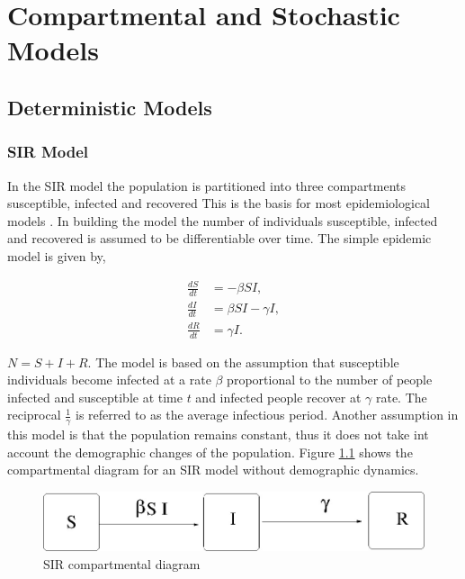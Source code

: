 \chapter{Compartmental and Stochastic Models}
\section{Deterministic Models}

\subsection{SIR Model}

In the SIR model the population is partitioned into three compartments susceptible, infected and recovered This is the basis for most epidemiological models \citep{m1925applications}. In building the model the number of individuals susceptible, infected and recovered is assumed to be differentiable over time.
The simple epidemic model is given by,
\begin{center}
\begin{align} \label{eqn4.1}
\frac{dS}{dt} &= -\beta SI,\\
 \frac{dI}{dt} &=\beta S I - \gamma  I, \\
 \frac{dR}{dt} &= \gamma  I.
\end{align}
\end{center}

$N = S + I + R.$
The model is based on the assumption that susceptible individuals become infected at a rate $\beta$ proportional to the number of people infected and susceptible at time $t$ and infected people recover at $\gamma$ rate. The reciprocal $\frac{1}{\gamma}$ is referred to as the average infectious period. Another assumption in this model is that the population remains constant, thus it does not take int account the demographic changes of the population. Figure \ref{fig 4.1} shows the compartmental diagram for an SIR model without demographic dynamics.
\begin{figure}[h!]
\centering
\includegraphics[scale=0.5]{images/sir.jpg} 
\caption{SIR compartmental diagram}\label{fig 4.1}
\end{figure}



